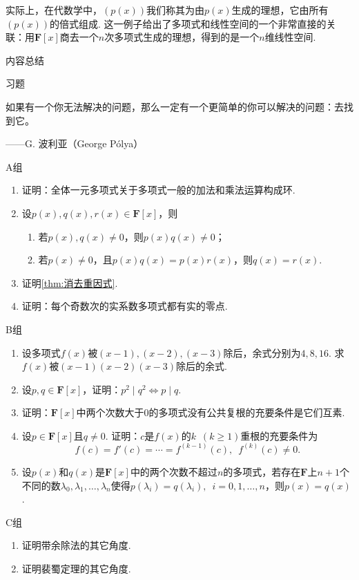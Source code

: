 实际上，在代数学中，$(p(x))$我们称其为由$p(x)$生成的理想，它由所有$(p(x))$的倍式组成. 这一例子给出了多项式和线性空间的一个非常直接的关联：用$\mathbf{F}[x]$商去一个$n$次多项式生成的理想，得到的是一个$n$维线性空间.

\vspace{2ex}

\centerline{\heiti \Large 内容总结}


\vspace{2ex}
\centerline{\heiti \Large 习题}

\vspace{2ex}
{\kaishu 如果有一个你无法解决的问题，那么一定有一个更简单的你可以解决的问题：去找到它。}
\begin{flushright}
    \kaishu
    ——G. 波利亚（George Pólya）
\end{flushright}

\centerline{\heiti A组}
\begin{enumerate}
    \item 证明：全体一元多项式关于多项式一般的加法和乘法运算构成环.
    \item 设$p(x),q(x),r(x)\in\mathbf{F}[x]$，则
          \begin{enumerate}
              \item 若$p(x),q(x)\neq 0$，则$p(x)q(x)\neq 0$；
              \item 若$p(x)\neq 0$，且$p(x)q(x)=p(x)r(x)$，则$q(x)=r(x)$.
          \end{enumerate}
    \item 证明\autoref{thm:消去重因式}.
    \item 证明：每个奇数次的实系数多项式都有实的零点.
\end{enumerate}

\centerline{\heiti B组}
\begin{enumerate}
    \item 设多项式$f(x)$被$(x-1),(x-2),(x-3)$除后，余式分别为$4,8,16$. 求$f(x)$被$(x-1)(x-2)(x-3)$除后的余式.
    \item 设$p,q\in\mathbf{F}[x]$，证明：$p^2 \mid q^2\iff p \mid q$.
    \item 证明：$\mathbf{F}[x]$中两个次数大于0的多项式没有公共复根的充要条件是它们互素.
    \item 设$p\in\mathbf{F}[x]$且$q\neq 0$. 证明：$c$是$f(x)$的$k\enspace(k\geqslant 1)$重根的充要条件为
          \[f(c)=f'(c)=\cdots=f^{(k-1)}(c),\enspace f^{(k)}(c)\neq 0.\]
    \item 设$p(x)$和$q(x)$是$\mathbf{F}[x]$中的两个次数不超过$n$的多项式，若存在$\mathbf{F}$上$n+1$个不同的数$\lambda_0,\lambda_1,\ldots,\lambda_n$使得$p(\lambda_i)=q(\lambda_i),\enspace i=0,1,\ldots,n$，则$p(x)=q(x)$.
\end{enumerate}

\centerline{\heiti C组}
\begin{enumerate}
    \item 证明带余除法的其它角度.
    \item 证明裴蜀定理的其它角度.
\end{enumerate}
